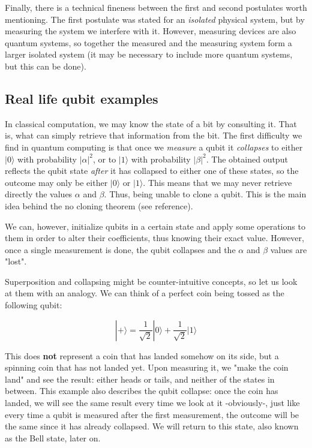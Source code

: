 Finally, there is a technical fineness between the first and second postulates worth mentioning. The first postulate was stated for an \emph{isolated} physical system, but by measuring the system we interfere with it. However, measuring devices are also quantum systems, so together the measured and the measuring system form a larger isolated system (it may be necessary to include more quantum systems, but this can be done).


\subsection{Real life qubit examples}


In classical computation, we may know the state of a bit by consulting it. That is, what can simply retrieve that information from the bit. The first difficulty we find in quantum computing is that once we \emph{measure} a qubit it \emph{collapses} to either $|0\rangle$ with probability $|\alpha|^2$, or to $|1\rangle$ with probability $|\beta|^2$. The obtained output reflects the qubit state \emph{after} it has collapsed to either one of these states, so the outcome may only be either $|0\rangle$ or $|1\rangle$. This means that we may never retrieve directly the values $\alpha$ and $\beta$. Thus, being unable to clone a qubit. This is the main idea behind the no cloning theorem (see reference).

We can, however, initialize qubits in a certain state and apply some operations to them in order to alter their coefficients, thus knowing their exact value. However, once a single measurement is done, the qubit collapses and the $\alpha$ and $\beta$ values are "lost".

Superposition and collapsing might be counter-intuitive concepts, so let us look at them with an analogy. We can think of a perfect coin being tossed as the following qubit:

$$ |+\rangle = \frac{1}{\sqrt{2}} |0\rangle + \frac{1}{\sqrt{2}} |1\rangle $$

This does \textbf{not} represent a coin that has landed somehow on its side, but a spinning coin that has not landed yet. Upon measuring it, we "make the coin land" and see the result: either heads or tails, and neither of the states in between. This example also describes the qubit collapse: once the coin has landed, we will see the same result every time we look at it -obviously-, just like every time a qubit is measured after the first measurement, the outcome will be the same since it has already collapsed. We will return to this state, also known as the Bell state, later on.

